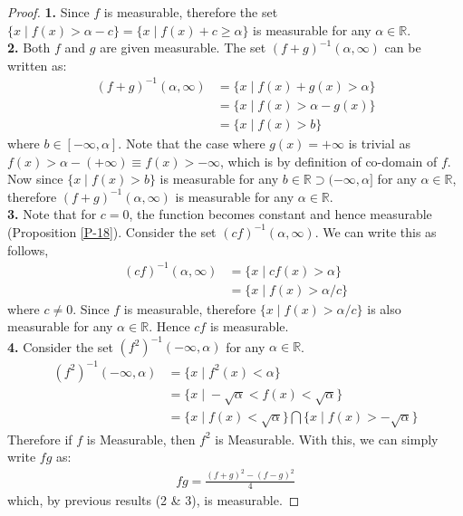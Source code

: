 \documentclass{article}
\theoremstyle{definition}
\theoremstyle{remark}
\theoremstyle{definition}
\theoremstyle{definition}
\theoremstyle{definition}
\newcommand{\bintrs}{\bigcap}
\newcommand{\where}{\;\vert\;}
\newcommand{\R}{\mathbb{R}}
\newcommand{\inv}[1]{{#1}^{-1}}
\begin{document}
\begin{proof}
	\textbf{1.} Since $ f $ is measurable, therefore the set $ \{x\where f(x) > \alpha- c\} = \{x\where f(x) + c\ge \alpha\} $ is measurable for any $ \alpha \in \R $.\\
	\textbf{2.} Both $ f $ and $ g $ are given measurable. The set $ \inv{(f+g)} (\alpha,\infty) $ can be written as:
	\begin{equation*}
		\begin{split}
			\inv{(f+g)}(\alpha, \infty)  &= \{x \where f(x) + g(x) > \alpha\}\\
			&= \{x\where f(x) > \alpha - g(x)\}\\
			&= \{x\where f(x) > b\}
		\end{split}
	\end{equation*}
where $ b\in [-\infty ,\alpha] $. Note that the case where $ g(x) = +\infty $ is trivial as $ f(x) > \alpha - (+\infty) \equiv f(x) > -\infty$, which is by definition of co-domain of $ f $. Now since $ \{x\where f(x) > b \}$ is measurable for any $ b\in \R \supset (-\infty,\alpha] $ for any $ \alpha\in \R $, therefore $ \inv{(f+g)}(\alpha,\infty) $ is measurable for any $ \alpha\in \R $. \\
\textbf{3.} Note that for $ c=0 $, the function becomes constant and hence measurable (Proposition \ref{P-18}). Consider the set $ \inv{(cf)}(\alpha,\infty)$. We can write this as follows, 
\begin{equation*}
	\begin{split}
		 \inv{(cf)}(\alpha,\infty) &= \{x\where cf(x) > \alpha\}\\
		 &= \{x\where f(x)> \alpha / c\}
	\end{split}
\end{equation*}
where $ c\neq 0 $. Since $ f $ is measurable, therefore $ \{x\where f(x)>\alpha/c\} $ is also measurable for any $ \alpha \in \R $. Hence $ cf $ is measurable.\\
\textbf{4.} Consider the set $ \inv{(f^{2})}(-\infty,\alpha) $ for any $ \alpha \in \R $. 
\begin{equation*}
	\begin{split}
		\inv{(f^{2})}(-\infty,\alpha) &= \{x\where f^2(x) < \alpha\}\\
		&= \{x\where -\sqrt{\alpha} < f(x) < \sqrt{\alpha}\}\\
		&= \{x\where f(x) < \sqrt{\alpha}\} \bintrs \{x\where f(x) > -\sqrt{\alpha}\}
	\end{split}
\end{equation*}
Therefore if $ f $ is Measurable, then $ f^{2} $ is Measurable. With this, we can simply write $ fg $ as:
\begin{equation*}
	\begin{split}
		fg = \frac{(f+g)^{2} - (f-g)^{2} }{4}
	\end{split}
\end{equation*}
which, by previous results (2 \& 3), is measurable. 
\end{proof}
\end{document}
